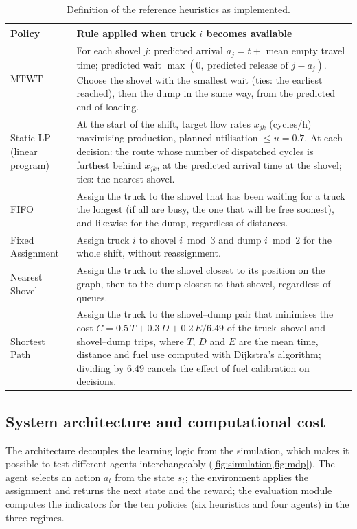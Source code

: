 \documentclass[11pt,a4paper]{article}
\newif\ifrevmarks
\newcommand{\revtag}[1]{\ifrevmarks\textsuperscript{\textcolor{red!70!black}{\scriptsize[#1]}}\fi}
\newcommand{\rev}[2]{\ifrevmarks{\color{revcolor}#2}\revtag{#1}\else#2\fi}
\newif\ifcorrmarks
\newcommand{\corr}[1]{\ifcorrmarks\textcolor{corrcolor}{#1}\else#1\fi}
\begin{document}
\begin{table}[H]
\centering
\caption{\rev{M25, Dir. corr. 1, v3}{Definition of the reference heuristics as implemented.}}
\label{tab:baselines}
\small
\begin{tabularx}{\textwidth}{lX}
\toprule
\textbf{Policy} & \textbf{Rule applied when truck $i$ becomes available} \\
\midrule
MTWT & For each shovel $j$: predicted arrival $a_j = t + $ mean empty travel time; predicted wait $\max(0,\ \text{predicted release of } j - a_j)$. Choose the shovel with the smallest wait (ties: the earliest reached), then the dump in the same way, from the predicted end of loading. \\
\corr{Static LP} (linear program) & At the start of the shift, target flow rates $x_{jk}$ (cycles/h) maximising production, planned utilisation $\leq u = 0.7$. At each decision: the route whose number of dispatched cycles is furthest behind $x_{jk}$, at the predicted arrival time at the shovel; ties: the nearest shovel. \\
FIFO & Assign the truck to the shovel that has been waiting for a truck the longest (if all are busy, the one that will be free soonest), and likewise for the dump, regardless of distances. \\
Fixed Assignment & Assign truck $i$ to shovel $i \bmod 3$ and dump $i \bmod 2$ for the whole shift, without reassignment. \\
Nearest Shovel & Assign the truck to the shovel closest to its position on the graph, then to the dump closest to that shovel, regardless of queues. \\
Shortest Path & Assign the truck to the shovel--dump pair that minimises the cost $C = 0.5\,T + 0.3\,D + 0.2\,E/6.49$ of the truck--shovel and shovel--dump trips, where $T$, $D$ and $E$ are the mean time, distance and fuel use computed with Dijkstra's algorithm; dividing by 6.49 cancels the effect of fuel calibration on decisions. \\
\bottomrule
\end{tabularx}
\end{table}

\subsection{System architecture and computational cost}
\label{sec:compute}

The architecture decouples the learning logic from the simulation, which makes it possible to test different agents interchangeably (\cref{fig:simulation,fig:mdp}). The agent selects an action $a_t$ from the state $s_t$; the environment applies the assignment and returns the next state and the reward; the evaluation module computes the indicators for \rev{v3}{the ten policies (six heuristics and four agents)} in the three regimes.
\end{document}
